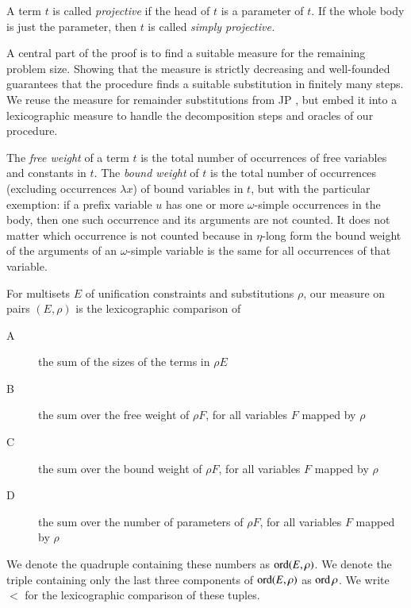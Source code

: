    \begin{defi}[$\jp D5$]
    \label{unif:def:projective} A term $t$ is called \emph{projective }if the head
    of $t$ is a parameter of $t$. If the whole body is just
    the parameter, then $t$ is called \emph{simply projective.}
    \end{defi}
    A central part of the proof is to find a suitable measure for the
    remaining problem size. Showing that the measure is strictly decreasing
    and well-founded guarantees that the procedure finds 
    a suitable substitution in finitely many steps. We reuse the measure for remainder substitutions
    from JP \cite{jp-76-unif}, but embed it into a lexicographic measure
    to handle the decomposition steps and oracles of our procedure.
    \begin{defi}[$\jp D7$] \label{unif:def:weights}
    The \emph{free weight} of a term $t$ is the total number of occurrences of
    free variables and constants in $t$.
    The \emph{bound weight} of $t$ is the total number of occurrences 
    (excluding occurrences $\lambda x$) of bound variables in $t$,
    but with the particular exemption: if a prefix variable $u$ 
    has one or more $\omega$-simple occurrences in the body,
    then one such occurrence and its arguments are not counted.
    It does not matter which occurrence is not counted because
    in $\eta$-long form the bound weight of the arguments of an 
    $\omega$-simple variable is the same for all occurrences
    of that variable.
    \end{defi}
    \begin{defi}[$\jp D8$] \label{unif:def:ord}
    For multisets $E$ of unification constraints and
    substitutions $\rho$, our measure on pairs $(E, \rho)$
    is the lexicographic comparison of
    \begin{description}
      \item[A] the sum of the sizes of the terms in $\rho E$
      \item[B] the sum over the free weight of $\rho F$, 
        for all variables $F$ mapped by $\rho$
      \item[C] the sum over the bound weight of $\rho F$, 
      for all variables $F$ mapped by $\rho$
      \item[D] the sum over the number of parameters of $\rho F$, 
      for all variables $F$ mapped by $\rho$
    \end{description}
    We denote the quadruple containing these numbers as $\operatorname{ord}(E,\rho)$.
    We denote the triple containing only the last three components of $\operatorname{ord}(E,\rho)$ as $\operatorname{ord} \rho$.
    We write $<$ for the lexicographic comparison of these tuples.
    \end{defi}

